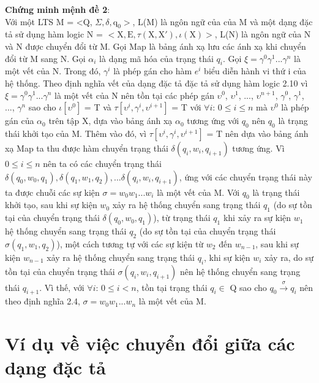 \documentclass[a4paper,13pt,oneside,openany]{book}
\begin{document}
\begin{flushleft}
		\textbf{Chứng minh mệnh đề 2}:\\
		Với một LTS M = <Q, $\Sigma, \delta, \textrm{q}_0>$, L(M) là ngôn ngữ của của M và một dạng đặc tả sử dụng hàm logic N = $<\textrm{X}, \textrm{E}, \tau(\textrm{X}, \textrm{X}'), \iota(\textrm{X})>$, L(N) là ngôn ngữ của N và N được chuyển đổi từ M.
		Gọi Map là bảng ánh xạ lưu các ánh xạ khi chuyển đổi từ M sang N. Gọi $\alpha_i$ là dạng mã hóa của trạng thái $q_i$. Gọi $\xi = \gamma^0\gamma^1...\gamma^n$ là một vết của N. 
		Trong đó, $\gamma^i$ là phép gán cho hàm $e^i$ biểu diễn hành vi thứ i của hệ thống. Theo định nghĩa vết của dạng đặc tả đặc tả sử dụng hàm logic 2.10 vì $\xi = \gamma^0\gamma^1...\gamma^n$ là một vết của N nên tồn tại các phép gán $\upsilon^0$, $\upsilon^1$, ..., $\upsilon^{n+1}$, $\gamma^0$, $\gamma^1$, ..., $\gamma^n$ sao cho $\iota[\upsilon^0]$ = T và $\tau[\upsilon^i, \gamma^i, \upsilon^{i+1}]$ = T với $\forall i$: $0 \leq i \leq n$ mà $\upsilon^0$ là phép gán của $\alpha_0$ trên tập X, dựa vào bảng ánh xạ $\alpha_0$ tương ứng với $q_0$ nên $q_0$ là trạng thái khởi tạo của M. Thêm vào đó, vì $\tau[\upsilon^i, \gamma^i, \upsilon^{i+1}]$ = T nên dựa vào bảng ánh xạ Map ta thu được hàm chuyển trạng thái $\delta(q_i, w_i, q_{i+1})$ tương ứng. Vì $0 \leq i \leq n$ nên ta có các chuyển trạng thái $\delta(q_0, w_0, q_1), \delta(q_1, w_1, q_2), ... \delta(q_i, w_i, q_{i+1})$, ứng với các chuyển trạng thái này ta được chuỗi các sự kiện $\sigma = w_0w_1...w_i$ là một vết của M.
		Với $q_0$ là trạng thái khởi tạo, sau khi sự kiện $w_0$ xảy ra hệ thống chuyển sang trạng thái $q_1$ (do sự tồn tại của chuyển trạng thái $\delta(q_0, w_0, q_1)$), từ trạng thái $q_1$ khi xảy ra sự kiện $w_1$ hệ thống chuyển sang trạng thái $q_2$ (do sự tồn tại của chuyển trạng thái $\sigma(q_1, w_1, q_2)$), một cách tương tự với các sự kiện từ $w_2$ đến $w_{n-1}$, sau khi sự kiện $w_{n-1}$ xảy ra hệ thống chuyển sang trạng thái $q_i$, khi sự kiện $w_i$ xảy ra, do sự tồn tại của chuyển trạng thái $\sigma(q_i, w_i, q_{i+1})$ nên hệ thống chuyển sang trạng thái $q_{i+1}$. Vì thế, với $\forall i$: $0 \leq i < n$, tồn tại trạng thái $q_i \in$ Q sao cho $q_0 \overset{\sigma}{\longrightarrow} q_{i}$ nên theo định nghĩa 2.4, $\sigma = w_0w_1...w_n$ là một vết của M.
	\chapter{Ví dụ về việc chuyển đổi giữa các dạng đặc tả}
	
	\end{flushleft}
\end{document}
